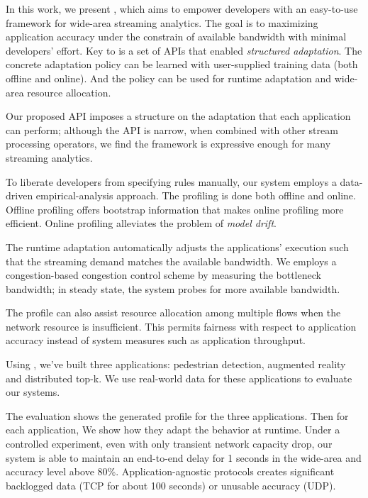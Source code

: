 In this work, we present \sysname{}, which aims to empower developers with an
easy-to-use framework for wide-area streaming analytics. The goal is to
maximizing application accuracy under the constrain of available bandwidth with
minimal developers' effort. Key to \sysname{} is a set of \maybe{} APIs that
enabled \textit{structured adaptation}. The concrete adaptation policy can be
learned with user-supplied training data (both offline and online). And the
policy can be used for runtime adaptation and wide-area resource allocation.

 Our proposed API imposes a structure on the adaptation that each
application can perform; although the API is narrow, when combined with other
stream processing operators, we find the framework is expressive enough for many
streaming analytics.

 To liberate developers from specifying rules manually, our
system employs a data-driven empirical-analysis approach. The profiling is done
both offline and online. Offline profiling offers bootstrap information that
makes online profiling more efficient. Online profiling alleviates the problem
of \textit{model drift}.

 The runtime adaptation automatically adjusts the applications'
execution such that the streaming demand matches the available bandwidth. We
employs a congestion-based congestion control scheme by measuring the bottleneck
bandwidth; in steady state, the system probes for more available bandwidth.

 The profile can also assist resource allocation among multiple
flows when the network resource is insufficient. This permits fairness with
respect to application accuracy instead of system measures such as application
throughput.

Using \sysname{}, we've built three applications: pedestrian detection,
augmented reality and distributed top-k. We use real-world data for these
applications to evaluate our systems.

The evaluation shows the generated profile for the three applications. Then for
each application, We show how they adapt the behavior at runtime. Under a
controlled experiment, even with only transient network capacity drop, our
system is able to maintain an end-to-end delay for 1 seconds in the wide-area
and accuracy level above 80\%. Application-agnostic protocols creates
significant backlogged data (TCP for about 100 seconds) or unusable accuracy
(UDP).


